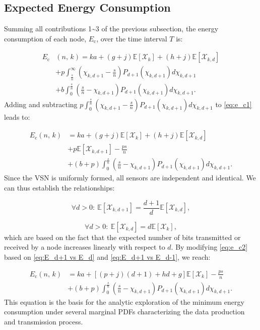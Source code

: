 \documentclass[twocolumn,english]{IEEEtran}
\theoremstyle{plain}
\theoremstyle{definition}
\begin{document}
\subsection{Expected Energy Consumption}

Summing all contributions 1\textasciitilde{}3 of the previous subsection,
the energy consumption of each node, $E_{\text{c}}$, over the time
interval $T$ is:

\begin{align}
E_{\text{c}} & \left(n,\, k\right)=ka+(g+j)\mathbb{E}[\mathcal{X}_{k}]+(h+j)\mathbb{E}[\mathcal{X}_{k,d}]\nonumber \\
 & +p\int_{\frac{s}{n}}^{\infty}(\chi_{k,d+1}-\frac{s}{n})P_{d+1}(\chi_{k,d+1})d\chi_{k,d+1}\label{eq:e_c1}\\
 & +b\int_{0}^{\frac{s}{n}}(\frac{s}{n}-\chi_{k,d+1})P_{d+1}(\chi_{k,d+1})d\chi_{k,d+1}.\nonumber 
\end{align}
Adding and subtracting $p\int_{0}^{\frac{s}{n}}(\chi_{k,d+1}-\frac{s}{n})P_{d+1}(\chi_{k,d+1})d\chi_{k,d+1}$
to \eqref{eq:e_c1} leads to:

\begin{align}
E_{\text{c}}\left(n,\, k\right) & =ka+(g+j)\mathbb{E}[\mathcal{X}_{k}]+(h+j)\mathbb{E}[\mathcal{X}_{k,d}]\nonumber \\
 & +p\mathbb{E}[\mathcal{X}_{k,d+1}]-\frac{ps}{n}\label{eq:e_c2}\\
 & +(b+p)\int_{0}^{\frac{s}{n}}(\frac{s}{n}-\chi_{k,d+1})P_{d+1}(\chi_{k,d+1})d\chi_{k,d+1}.\nonumber 
\end{align}
Since the VSN is uniformly formed, all sensors are independent and
identical. We can thus establish the relationships:

\begin{equation}
\forall d>0:\:\mathbb{E}\left[\mathcal{X}_{k,d+1}\right]=\frac{d+1}{d}\mathbb{E}\left[\mathcal{X}_{k,d}\right],\label{eq:E_d+1 vs E_d}
\end{equation}


\begin{equation}
\forall d>0:\:\mathbb{E}\left[\mathcal{X}_{k,d}\right]=d\mathbb{E}\left[\mathcal{X}_{k}\right],\label{eq:E_d+1 vs E_d-1}
\end{equation}
which are based on the fact that the expected number of bits transmitted
or received by a node increases linearly with respect to $d$. By
modifying \eqref{eq:e_c2} based on \eqref{eq:E_d+1 vs E_d} and \eqref{eq:E_d+1 vs E_d-1},
we reach:

\begin{align}
E_{\text{c}}\left(n,\, k\right) & =ka+\left[(p+j)\left(d+1\right)+hd+g\right]\mathbb{E}[\mathcal{X}_{k}]-\frac{ps}{n}\nonumber \\
 & +(b+p)\int_{0}^{\frac{s}{n}}(\frac{s}{n}-\chi_{k,d+1})P_{d+1}(\chi_{k,d+1})d\chi_{k,d+1}.\label{eq:e_c2-1}
\end{align}
This equation is the basis for the analytic exploration of the minimum
energy consumption under several marginal PDFs characterizing the
data production and transmission process.
\end{document}
